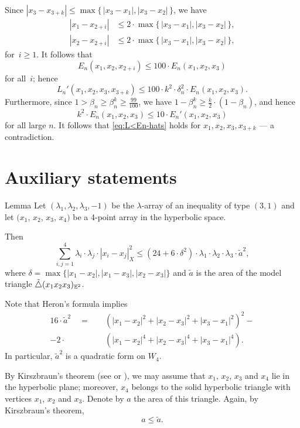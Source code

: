 Since $|x_3-x_{3+k}|\leqslant \max\{\,|x_3-x_1|,|x_3-x_2|\,\}$, we have
\begin{align*}
|x_1-x_{2+i}|&\leqslant 2\cdot \max\{\,|x_3-x_1|,|x_3-x_2|\,\},\\
|x_2-x_{2+i}|&\leqslant 2\cdot \max\{\,|x_3-x_1|,|x_3-x_2|\,\},
\end{align*}
for~$i\geqslant1$.
It follows that
\[
E_n(x_1,x_2,x_{2+i})\leqslant 100\cdot E_n(x_1,x_2,x_3)
\]
for all~$i$; hence
\[L_n'(x_1,x_2,x_3,x_{3+k})\leqslant 100\cdot k^2\cdot \delta_n^2\cdot E_n(x_1,x_2,x_3).
\]
Furthermore, since $1>\beta_n\geqslant\beta_n^{k}\geqslant \tfrac{99}{100}$,
we have $1-\beta_n^{k}\geqslant \tfrac k2\cdot(1-\beta_n)$, and hence
\[
k^2\cdot E_n(x_1,x_2,x_3)\leqslant 10\cdot E_n'(x_1,x_2,x_3)
\]
for all large $n$.
It follows that \ref{eq:L<En-hats} holds for $x_1,x_2,x_3,x_{3+k}$ --- a contradiction.
\qeds

\section{Auxiliary statements}\label{Auxiliary statements}

\begin{thm}{Lemma}\label{lem:area-bound}
Let $(\lambda_1,\lambda_2,\lambda_3,-1)$ be the $\lambda$-array of an inequality of type $(3,1)$ and
let $(x_1$, $x_2$, $x_3$, $x_4)$ be a 4-point array in the hyperbolic space.

Then
\[\sum_{i,j=1}^4\lambda_i\cdot\lambda_j\cdot|x_i-x_j|_X^2
\leqslant
(24+6\cdot\delta^2)\cdot\lambda_1\cdot\lambda_2\cdot\lambda_3\cdot\tilde a^2,\]
where $\delta=\max\{|x_1-x_2|,|x_1-x_3|,|x_2-x_3|\}$
and
$\tilde a$ is the area of the model triangle $\tilde\triangle(x_1x_2x_3)_{\mathbb{E}^2}$.
\end{thm}

Note that Heron's formula implies
\begin{align*}
16\cdot \tilde a^2
\quad=\quad &(|x_1-x_2|^2+|x_2-x_3|^2+|x_3-x_1|^2)^2-
\\
-2\cdot &(|x_1-x_2|^4+|x_2-x_3|^4+|x_3-x_1|^4).
\end{align*}
In particular, $\tilde a^2$ is a quadratic form on $W_4$.

By Kirszbraun's theorem (see \cite{lang-schroeder,AKP-2011} or \cite[Chapter 10]{AKP-2024}), we may assume that $x_1$, $x_2$, $x_3$ and $x_4$ lie in the hyperbolic plane; moreover, $x_4$ belongs to the solid hyperbolic triangle with vertices $x_1$, $x_2$ and $x_3$.
Denote by $a$ the area of this triangle.
Again, by Kirszbraun's theorem,
\[a\leqslant \tilde a.\]

